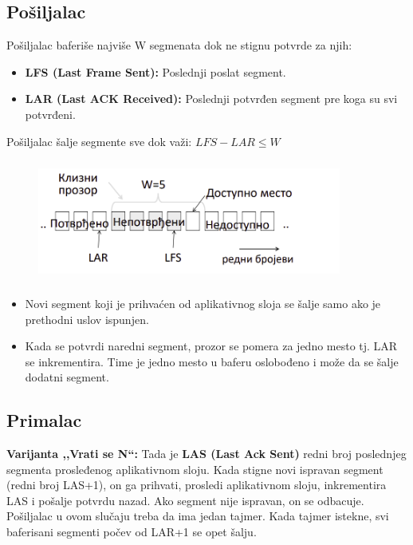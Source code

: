 \documentclass[a4paper]{article}
\begin{document}
    \subsection{Pošiljalac}
        \noindent Pošiljalac baferiše najviše W segmenata dok ne stignu potvrde za njih:
        \begin{itemize}
            \item \textbf{LFS (Last Frame Sent):} Poslednji poslat segment.
            \item \textbf{LAR (Last ACK Received):} Poslednji potvrđen segment pre koga su svi potvrđeni.
        \end{itemize}
        Pošiljalac šalje segmente sve dok važi: $LFS - LAR \leq W$
        \begin{figure}[H]
            \begin{center}
                \includegraphics[width=100mm,height=40mm]{Slike/tps_klizni_prozori.png}
            \end{center}
        \end{figure}
        \begin{itemize}
            \item Novi segment koji je prihvaćen od aplikativnog sloja se šalje samo ako
                  je prethodni uslov ispunjen. 
            \item Kada se potvrdi naredni segment, prozor se pomera za jedno mesto tj. LAR se
                  inkrementira. Time je jedno mesto u baferu oslobođeno i može da se šalje
                  dodatni segment. 
        \end{itemize}

    \subsection{Primalac}
        \textbf{Varijanta ,,Vrati se N``:} Tada je \textbf{LAS (Last Ack Sent)} redni broj 
        poslednjeg segmenta prosleđenog
        aplikativnom sloju. Kada stigne novi ispravan segment (redni broj LAS+1), on ga prihvati, 
        prosledi aplikativnom sloju, inkrementira LAS i pošalje potvrdu nazad. Ako segment nije
        ispravan, on se odbacuje. Pošiljalac u ovom slučaju treba da ima jedan tajmer.
        Kada tajmer istekne, svi baferisani segmenti počev od LAR+1 se opet šalju. \\
\end{document}
